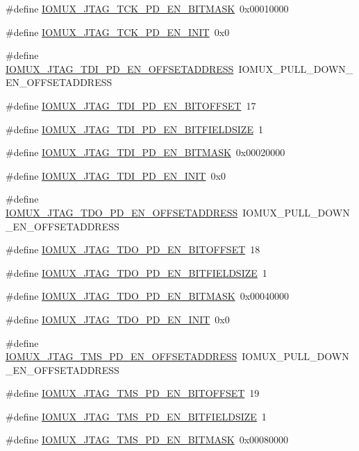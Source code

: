 \begin{DoxyCompactItemize}
\#define \hyperlink{a00560_a6cbdd603757dd5d43662c26001703e94}{IOMUX\_\-JTAG\_\-TCK\_\-PD\_\-EN\_\-BITMASK}~0x00010000
\item 
\#define \hyperlink{a00560_af23cb565042133f3775c308ce7782b12}{IOMUX\_\-JTAG\_\-TCK\_\-PD\_\-EN\_\-INIT}~0x0
\item 
\#define \hyperlink{a00560_ad5620896d3d9e0c8c798c702ba5648f6}{IOMUX\_\-JTAG\_\-TDI\_\-PD\_\-EN\_\-OFFSETADDRESS}~IOMUX\_\-PULL\_\-DOWN\_\-EN\_\-OFFSETADDRESS
\item 
\#define \hyperlink{a00560_aba681976cfbf0f9ca42a45326bd5537d}{IOMUX\_\-JTAG\_\-TDI\_\-PD\_\-EN\_\-BITOFFSET}~17
\item 
\#define \hyperlink{a00560_af32edd216c36bc6e3d8237e3c0e055ac}{IOMUX\_\-JTAG\_\-TDI\_\-PD\_\-EN\_\-BITFIELDSIZE}~1
\item 
\#define \hyperlink{a00560_afbcb6229897607641988e2d5f6239e5f}{IOMUX\_\-JTAG\_\-TDI\_\-PD\_\-EN\_\-BITMASK}~0x00020000
\item 
\#define \hyperlink{a00560_a1b8f37e292cdadc8f7a0d613b152f7fb}{IOMUX\_\-JTAG\_\-TDI\_\-PD\_\-EN\_\-INIT}~0x0
\item 
\#define \hyperlink{a00560_a52d0015d07e6d532ba0e52e229ada129}{IOMUX\_\-JTAG\_\-TDO\_\-PD\_\-EN\_\-OFFSETADDRESS}~IOMUX\_\-PULL\_\-DOWN\_\-EN\_\-OFFSETADDRESS
\item 
\#define \hyperlink{a00560_add1bac9ea5f68fbbba03127042906269}{IOMUX\_\-JTAG\_\-TDO\_\-PD\_\-EN\_\-BITOFFSET}~18
\item 
\#define \hyperlink{a00560_a74eaab272c2c16b510e4bd7303fa7312}{IOMUX\_\-JTAG\_\-TDO\_\-PD\_\-EN\_\-BITFIELDSIZE}~1
\item 
\#define \hyperlink{a00560_a4a2252f1f805b4924f3c9ab0c4430f4e}{IOMUX\_\-JTAG\_\-TDO\_\-PD\_\-EN\_\-BITMASK}~0x00040000
\item 
\#define \hyperlink{a00560_a644b6b69bfab81308ce3d3f92d607264}{IOMUX\_\-JTAG\_\-TDO\_\-PD\_\-EN\_\-INIT}~0x0
\item 
\#define \hyperlink{a00560_a8b69372fcd861e97530514a896ceb9ac}{IOMUX\_\-JTAG\_\-TMS\_\-PD\_\-EN\_\-OFFSETADDRESS}~IOMUX\_\-PULL\_\-DOWN\_\-EN\_\-OFFSETADDRESS
\item 
\#define \hyperlink{a00560_ab2363c2fa5796070189f750a9cd0fc3f}{IOMUX\_\-JTAG\_\-TMS\_\-PD\_\-EN\_\-BITOFFSET}~19
\item 
\#define \hyperlink{a00560_af0a385065b55c3609af5fcb04afe69f0}{IOMUX\_\-JTAG\_\-TMS\_\-PD\_\-EN\_\-BITFIELDSIZE}~1
\item 
\#define \hyperlink{a00560_a8762e1485d3638a35340159e5966a77c}{IOMUX\_\-JTAG\_\-TMS\_\-PD\_\-EN\_\-BITMASK}~0x00080000

\end{DoxyCompactItemize}
